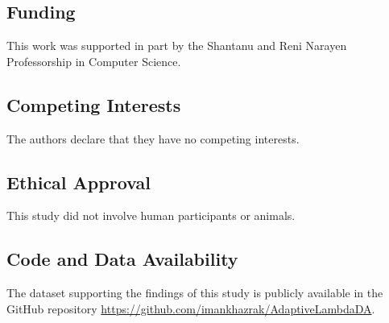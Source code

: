 \documentclass[pdflatex,sn-mathphys-num]{sn-jnl}
\theoremstyle{thmstyleone}
\theoremstyle{thmstyletwo}
\theoremstyle{thmstylethree}
\begin{document}
\subsection*{Funding}
This work was supported in part by the Shantanu and Reni Narayen Professorship in Computer Science.

\subsection*{Competing Interests}
The authors declare that they have no competing interests.

\subsection*{Ethical Approval}
This study did not involve human participants or animals.


\subsection*{Code and Data Availability}
The dataset supporting the findings of this study is publicly available in the GitHub repository \url{https://github.com/imankhazrak/AdaptiveLambdaDA}.
\end{document}
